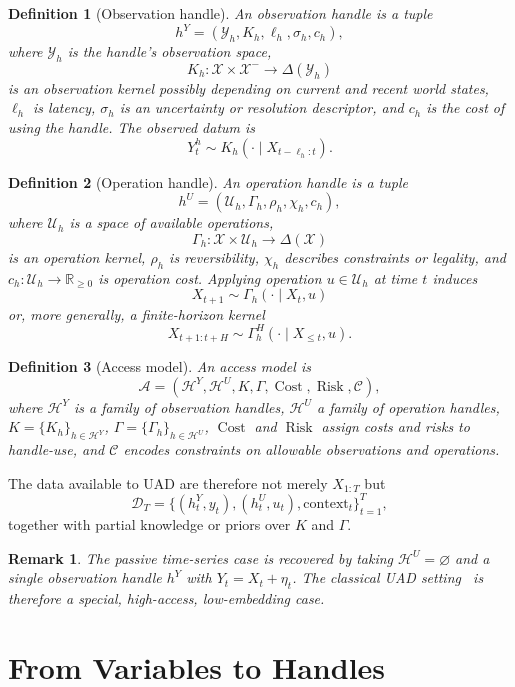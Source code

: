 \documentclass[11pt]{article}
\newtheorem{definition}{Definition}
\newtheorem{remark}{Remark}
\newcommand{\X}{\mathcal X}
\newcommand{\Y}{\mathcal Y}
\newcommand{\U}{\mathcal U}
\newcommand{\Hh}{\mathcal H}
\newcommand{\A}{\mathcal A}
\newcommand{\D}{\mathcal D}
\newcommand{\cost}{\operatorname{Cost}}
\newcommand{\risk}{\operatorname{Risk}}
\begin{document}
\begin{definition}[Observation handle]
An observation handle is a tuple
\[
    h^Y = (\Y_h,K_h,\ell_h,\sigma_h,c_h),
\]
where $\Y_h$ is the handle's observation space,
\[
    K_h:\X\times \X^{-}\to \Delta(\Y_h)
\]
is an observation kernel possibly depending on current and recent world states,
$\ell_h$ is latency, $\sigma_h$ is an uncertainty or resolution descriptor, and
$c_h$ is the cost of using the handle. The observed datum is
\[
    Y^h_t \sim K_h(\cdot\mid X_{t-\ell_h:t}).
\]
\end{definition}

\begin{definition}[Operation handle]
An operation handle is a tuple
\[
    h^U = (\U_h,\Gamma_h,\rho_h,\chi_h,c_h),
\]
where $\U_h$ is a space of available operations,
\[
    \Gamma_h:\X\times \U_h\to \Delta(\X)
\]
is an operation kernel, $\rho_h$ is reversibility, $\chi_h$ describes constraints
or legality, and $c_h:\U_h\to\mathbb R_{\ge0}$ is operation cost. Applying
operation $u\in\U_h$ at time $t$ induces
\[
    X_{t+1}\sim \Gamma_h(\cdot\mid X_t,u)
\]
or, more generally, a finite-horizon kernel
\[
    X_{t+1:t+H}\sim \Gamma_h^H(\cdot\mid X_{\le t},u).
\]
\end{definition}

\begin{definition}[Access model]
An access model is
\[
    \A
    =
    (\Hh^Y,\Hh^U,K,\Gamma,\cost,\risk,\mathcal C),
\]
where $\Hh^Y$ is a family of observation handles, $\Hh^U$ a family of operation
handles, $K=\{K_h\}_{h\in\Hh^Y}$, $\Gamma=\{\Gamma_h\}_{h\in\Hh^U}$, $\cost$
and $\risk$ assign costs and risks to handle-use, and $\mathcal C$ encodes
constraints on allowable observations and operations.
\end{definition}

The data available to UAD are therefore not merely $X_{1:T}$ but
\[
    \D_T =
    \{(h_t^Y,y_t), (h_t^U,u_t), \text{context}_t\}_{t=1}^T,
\]
together with partial knowledge or priors over $K$ and $\Gamma$.

\begin{remark}
The passive time-series case is recovered by taking $\Hh^U=\varnothing$ and a
single observation handle $h^Y$ with $Y_t=X_t+\eta_t$. The classical UAD setting~\cite{uad2025,ConantAshby1970,kirchhoff2018markov}
is therefore a special, high-access, low-embedding case.
\end{remark}

\section{From Variables to Handles}
\end{document}
